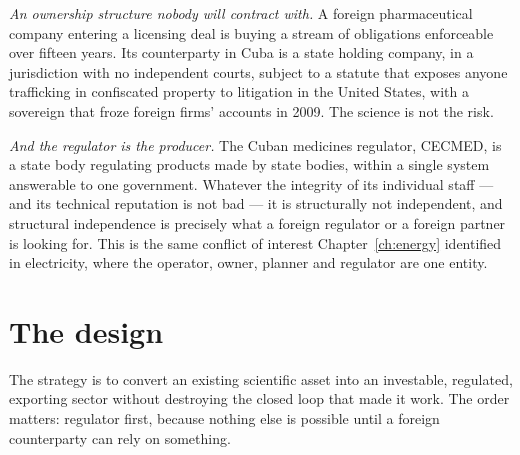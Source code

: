 \emph{An ownership structure nobody will contract with.} A foreign
pharmaceutical company entering a licensing deal is buying a stream of
obligations enforceable over fifteen years. Its counterparty in Cuba is a state
holding company, in a jurisdiction with no independent courts, subject to a
statute that exposes anyone trafficking in confiscated property to litigation in
the United States, with a sovereign that froze foreign firms' accounts in 2009.
The science is not the risk.

\emph{And the regulator is the producer.} The Cuban medicines regulator, CECMED,
is a state body regulating products made by state bodies, within a single system
answerable to one government. Whatever the integrity of its individual staff ---
and its technical reputation is not bad --- it is structurally not independent,
and structural independence is precisely what a foreign regulator or a foreign
partner is looking for. This is the same conflict of interest
Chapter~\ref{ch:energy} identified in electricity, where the operator, owner,
planner and regulator are one entity.

\section{The design}

The strategy is to convert an existing scientific asset into an investable,
regulated, exporting sector without destroying the closed loop that made it work.
The order matters: regulator first, because nothing else is possible until a
foreign counterparty can rely on something.

